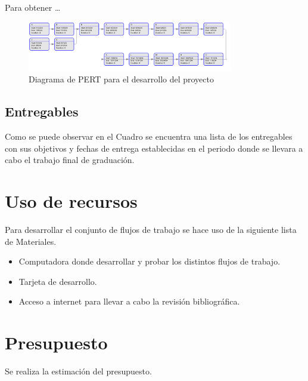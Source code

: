\documentclass[12pt]{article}
\begin{document}
Para obtener \dots

\begin{figure}[h!]
  \centering
  \includegraphics[width=0.8\textwidth]{diagramas/pert.png}
  \caption{Diagrama de PERT para el desarrollo del proyecto}
  \label{fig:pert}
\end{figure}

\subsection{Entregables}

Como se puede observar en el Cuadro se encuentra una lista de los entregables con sus objetivos y fechas de entrega establecidas en el periodo donde se llevara a cabo el trabajo final de graduación.



\section{Uso de recursos}

Para desarrollar el conjunto de flujos de trabajo se hace uso de la siguiente lista de Materiales.

\begin{itemize}
  \item Computadora donde desarrollar y probar los distintos flujos de trabajo.
  \item Tarjeta de desarrollo.
  \item Acceso a internet para llevar a cabo la revisión bibliográfica.
\end{itemize}

\newpage

\section{Presupuesto}

Se realiza la estimación del presupuesto. 


\newpage
\nocite{moghaddam2021guidance}
\nocite{zhang2021guidance}
\nocite{karimi2021guidance}
\nocite{hewing2023enhancing}
\nocite{chai2021review}
\nocite{bitlmal2024guidance}
\nocite{bai2023vision}
\nocite{qinghua2023navigation}
\nocite{wang2022deep}
\nocite{gandhiterminal}
\nocite{Colmenarejo2024}
\nocite{AEM2017}
\nocite{Gutierrez2022}
\nocite{Ortega2021}
\nocite{Colmenarejo2022}
\nocite{TecCR2023_MUSA}
\nocite{TecCR2023_Satelite}
\nocite{Furfaro1997}
\nocite{Bouabdallah2009}
\nocite{Balaram2008}
\nocite{MathWorks2024_ss}
\nocite{MathWorks2024}



\end{document}
